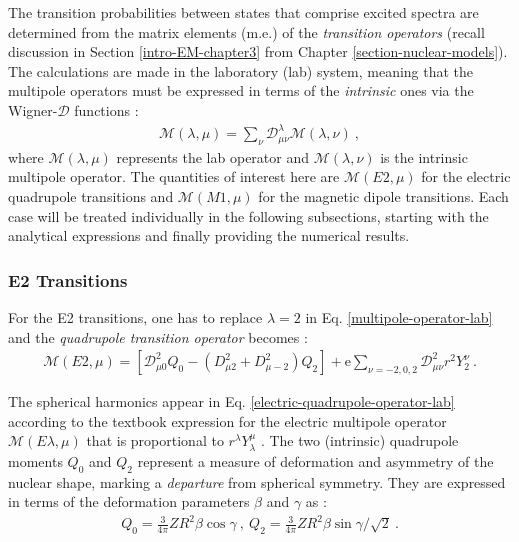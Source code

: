 The transition probabilities between states that comprise excited spectra are determined from the matrix elements (m.e.) of the \emph{transition operators} (recall discussion in Section \ref{intro-EM-chapter3} from Chapter \ref{section-nuclear-models}). The calculations are made in the laboratory (lab) system, meaning that the multipole operators must be expressed in terms of the \emph{intrinsic} ones via the Wigner-$\mathcal{D}$ functions \cite{toki1975asymmetric,bohr1998nuclear}:
\begin{align}
    \mathcal{M}(\lambda,\mu)=\sum_\nu\mathcal{D}_{\mu\nu}^\lambda\mathcal{M}(\lambda,\nu)\ ,
    \label{multipole-operator-lab}
\end{align}
where $\mathcal{M}(\lambda,\mu)$ represents the lab operator and $\mathcal{M}(\lambda,\nu)$ is the intrinsic multipole operator. The quantities of interest here are $\mathcal{M}(E2,\mu)$ for the electric quadrupole transitions and $\mathcal{M}(M1,\mu)$ for the magnetic dipole transitions. Each case will be treated individually in the following subsections, starting with the analytical expressions and finally providing the numerical results.

\subsubsection{E2 Transitions}

For the E2 transitions, one has to replace $\lambda=2$ in Eq. \ref{multipole-operator-lab} and the \emph{quadrupole transition operator} becomes \cite{toki1975asymmetric,raduta2020towards}:
\begin{align}
    \mathcal{M}(E2,\mu)=\left[\mathcal{D}_{\mu0}^2Q_0-\left(D_{\mu 2}^2+D_{\mu -2}^2\right)Q_2\right]+\mathrm{e}\sum_{\nu=-2,0,2}\mathcal{D}_{\mu\nu}^2r^2Y_2^\nu\ .
    \label{electric-quadrupole-operator-lab}
\end{align}

The spherical harmonics appear in Eq. \ref{electric-quadrupole-operator-lab} according to the textbook expression for the electric multipole operator $\mathcal{M}(E\lambda,\mu)$ that is proportional to $r^\lambda Y_\lambda^\mu$ \cite{heyde1994nuclear}. The two (intrinsic) quadrupole moments $Q_{0}$ and $Q_{2}$ represent a measure of deformation and asymmetry of the nuclear shape, marking a \emph{departure} from spherical symmetry. They are expressed in terms of the deformation parameters $\beta$ and $\gamma$ as \cite{raduta2018wobbling}:
\begin{align}
    Q_{0}=\frac{3}{4\pi}ZR^2\beta\cos\gamma\ ,\ Q_{2}=\frac{3}{4\pi}ZR^2\beta\sin\gamma/\sqrt{2}\ .
    \label{quadrupole-components-Q0-Q2}
\end{align}

